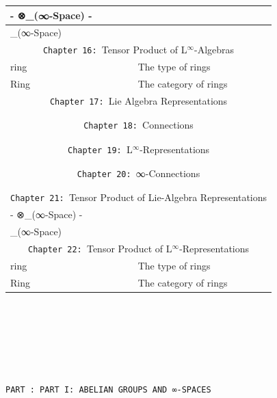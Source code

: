 \documentclass{book}
\theoremstyle{definition}
\newcounter{pcounter}
\newcounter{partcount}
\renewcommand{\part}[1]{
\newpage
{
\Huge 
\begin{center}
\ \\
\ \\
\ \\
\ \\
\ \\
\ \\
\thispagestyle{empty}
\texttt{PART {\thepartcount}: #1}
\stepcounter{partcount}
\end{center}}
\ \\
\ \\
}
\begin{document}
{\begin{longtable}{|| l || l ||}
\hline \hline
- ⊗\_(∞-Space) - &  \\
\hline
[-,-]\_(∞-Space) &  \\
\hline \hline
\multicolumn{2}{||c||}{\texttt{Chapter 16: }Tensor Product of L${}^{\infty}$-Algebras} \\
\hline \hline
ring & The type of rings \\ 
 \hline
Ring & The category of rings \\
 \hline \hline
\multicolumn{2}{||c||}{\texttt{Chapter 17: }Lie Algebra Representations} \\
\hline \hline
 & \\
\hline
 & \\
\hline \hline
\multicolumn{2}{||c||}{\texttt{Chapter 18: }Connections} \\
\hline \hline
 & \\
\hline
 & \\
\hline \hline
\multicolumn{2}{||c||}{\texttt{Chapter 19: }L${}^{\infty}$-Representations} \\
\hline \hline
 & \\
\hline
 & \\
\hline \hline
\multicolumn{2}{||c||}{\texttt{Chapter 20: }∞-Connections} \\
\hline \hline
 & \\
\hline
 & \\
\hline \hline
\multicolumn{2}{||c||}{\texttt{Chapter 21: }Tensor Product of Lie-Algebra Representations} \\
\hline \hline
- ⊗\_(∞-Space) - &  \\
\hline
[-,-]\_(∞-Space) &  \\
\hline \hline
\multicolumn{2}{||c||}{\texttt{Chapter 22: }Tensor Product of L${}^{\infty}$-Representations} \\
\hline \hline
ring & The type of rings \\
 \hline
Ring & The category of rings \\
 \hline \hline
\end{longtable}
}




\part{PART I: ABELIAN GROUPS AND ∞-SPACES}
\end{document}
